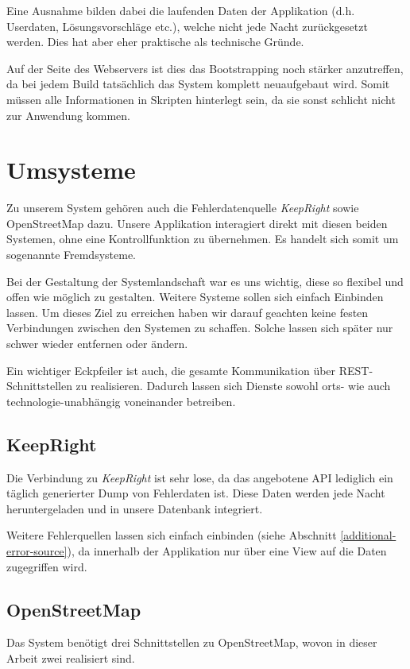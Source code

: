 Eine Ausnahme bilden dabei die laufenden Daten der Applikation (d.h. Userdaten, Lösungsvorschläge etc.), welche nicht jede Nacht zurückgesetzt werden.
Dies hat aber eher praktische als technische Gründe.

Auf der Seite des Webservers ist dies das \gls{Bootstrapping} noch stärker anzutreffen, da bei jedem Build tatsächlich das System komplett neuaufgebaut wird.
Somit müssen alle Informationen in Skripten hinterlegt sein, da sie sonst schlicht nicht zur Anwendung kommen.

\section{Umsysteme}
Zu unserem System gehören auch die Fehlerdatenquelle \emph{KeepRight} sowie \gls{OpenStreetMap} dazu.
Unsere Applikation interagiert direkt mit diesen beiden Systemen, ohne eine Kontrollfunktion zu übernehmen.
Es handelt sich somit um sogenannte Fremdsysteme.

Bei der Gestaltung der Systemlandschaft war es uns wichtig, diese so flexibel und offen wie möglich zu gestalten.
Weitere Systeme sollen sich einfach Einbinden lassen.
Um dieses Ziel zu erreichen haben wir darauf geachten keine festen Verbindungen zwischen den Systemen zu schaffen.
Solche lassen sich später nur schwer wieder entfernen oder ändern.

Ein wichtiger Eckpfeiler ist auch, die gesamte Kommunikation über \gls{REST}-Schnittstellen zu realisieren.
Dadurch lassen sich Dienste sowohl orts- wie auch technologie-unabhängig voneinander betreiben.

\subsection{KeepRight}
Die Verbindung zu \emph{KeepRight} ist sehr lose, da das angebotene \gls{API} lediglich ein täglich generierter Dump von Fehlerdaten ist.
Diese Daten werden jede Nacht heruntergeladen und in unsere Datenbank integriert.

Weitere Fehlerquellen lassen sich einfach einbinden (siehe Abschnitt \ref{additional-error-source}), da innerhalb der Applikation nur über eine View auf die Daten zugegriffen wird.

\subsection{OpenStreetMap}
Das System benötigt drei Schnittstellen zu \gls{OpenStreetMap}, wovon in dieser Arbeit zwei realisiert sind.


